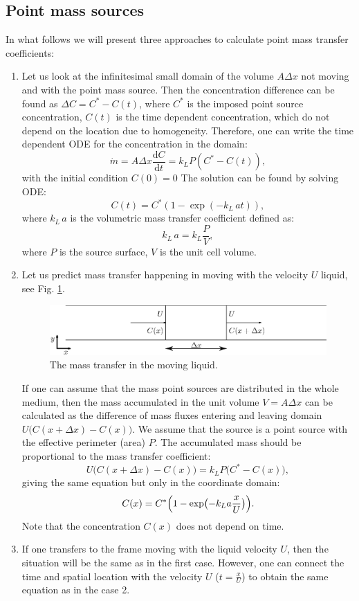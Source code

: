 \documentclass{article}
\newcommand{\beq}{\begin{equation}}
\newcommand{\feq}{\end{equation}}
\newcommand{\vol}{k_L\,a}
\newcommand{\cstar}{C^{*}}
\begin{document}
\subsection{Point mass sources}
In what follows we will present three approaches to calculate point mass transfer
coefficients:
\begin{enumerate}
\item
Let us look at the infinitesimal small domain of the volume $A \Delta x$ not
moving and with the point mass source.  Then the concentration difference can be found as $\Delta C =
\cstar -
C(t)$, where $\cstar$ is the imposed point source concentration, $C(t)$ is
the time dependent concentration, which do not depend on the location due to homogeneity. Therefore, one can write the time dependent ODE for the
concentration in the domain:
\beq
\dot{m}= A \Delta x \frac{\mathrm{d}C}{\mathrm{d} t} = k_L P (\cstar-C(t)), 
\feq
with the initial condition $C(0)=0$
The solution can be found by solving ODE:
\beq
C(t)= \cstar (1-\exp(-\vol t )), 
\feq
where $\vol$ is the volumetric mass transfer coefficient defined as:
\beq
\vol=k_L \frac{P}{V},
\feq
where $P$ is the source surface, $V$ is the unit cell volume.
\item
Let us predict mass transfer happening in moving with the velocity
$U$ liquid, see Fig. \ref{fig:moving:frame}. 
\begin{figure}[htb!]
\includegraphics[width=\textwidth]{Figures/mass_transfer.eps}
\caption{The mass transfer in the moving liquid. \label{fig:moving:frame}}
\end{figure}

If one can assume that the mass point sources are distributed in the whole medium, then the mass accumulated in the unit volume $V=A \Delta x$ can be calculated as the difference of 
mass fluxes entering and leaving domain $U \bigl(C(x+\Delta x)-C(x)\bigr)$. We assume that the
source is a point source with the effective perimeter (area) $P$. The accumulated mass should be proportional
to the mass transfer coefficient:
\beq
U \bigl(C(x+\Delta x)-C(x)\bigr)=k_L P \bigl(\cstar-C(x)\bigr), 
\feq 
giving the same equation but only in the coordinate domain:
\beq
C(x)= \cstar \Bigl(1-\exp\bigl(-k_L a \frac{x}{U} \bigr)\Bigr).
\label{main:mass:transfer:expression} 
\feq
Note that the concentration $C(x)$ does not depend on time. 

\item If one transfers to the frame moving with the liquid velocity $U$, then the situation will be
the same as in the first case. However, one can connect the time and spatial location with the
velocity $U$ ($t=\frac{x}{U}$) to obtain the same equation as in the case 2.
\end{enumerate}
\end{document}
